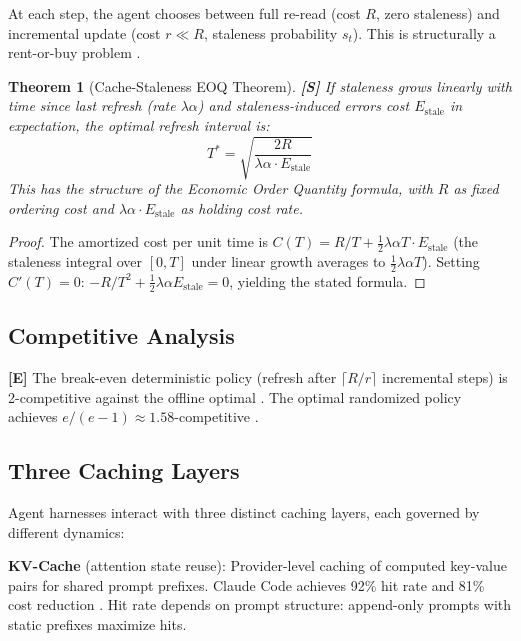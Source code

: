 \documentclass[11pt,a4paper]{article}
\newtheorem{theorem}{Theorem}[section]
\theoremstyle{definition}
\theoremstyle{remark}
\begin{document}
At each step, the agent chooses between full re-read (cost $R$, zero staleness) and incremental update (cost $r \ll R$, staleness probability $s_t$). This is structurally a rent-or-buy problem \citep{sleator1985amortized}.

\begin{theorem}[Cache-Staleness EOQ Theorem]\label{thm:cache-eoq}
\textbf{[S]} If staleness grows linearly with time since last refresh (rate $\lambda\alpha$) and staleness-induced errors cost $E_{\mathrm{stale}}$ in expectation, the optimal refresh interval is:
\[
    T^* = \sqrt{\frac{2R}{\lambda\alpha \cdot E_{\mathrm{stale}}}}
\]
This has the structure of the Economic Order Quantity formula, with $R$ as fixed ordering cost and $\lambda\alpha \cdot E_{\mathrm{stale}}$ as holding cost rate.
\end{theorem}

\begin{proof}
The amortized cost per unit time is $C(T) = R/T + \frac{1}{2}\lambda\alpha T \cdot E_{\mathrm{stale}}$ (the staleness integral over $[0, T]$ under linear growth averages to $\frac{1}{2}\lambda\alpha T$). Setting $C'(T) = 0$: $-R/T^2 + \frac{1}{2}\lambda\alpha E_{\mathrm{stale}} = 0$, yielding the stated formula.
\end{proof}

\subsection{Competitive Analysis}

\textbf{[E]} The break-even deterministic policy (refresh after $\lceil R/r \rceil$ incremental steps) is 2-competitive against the offline optimal \citep{sleator1985amortized}. The optimal randomized policy achieves $e/(e-1) \approx 1.58$-competitive \citep{fiat1991competitive}.

\subsection{Three Caching Layers}

Agent harnesses interact with three distinct caching layers, each governed by different dynamics:

\textbf{KV-Cache} (attention state reuse): Provider-level caching of computed key-value pairs for shared prompt prefixes. Claude Code achieves 92\% hit rate and 81\% cost reduction \citep{anthropic2026agentic}. Hit rate depends on prompt structure: append-only prompts with static prefixes maximize hits.
\end{document}
